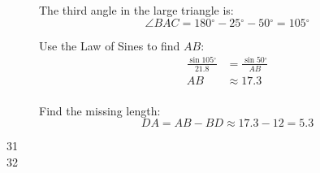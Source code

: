 \documentclass{exam}
\newcommand{\dg}{\ensuremath{^\circ}}
\begin{document}
\begin{description}
        The third angle in the large triangle is: 
        \[
          \angle BAC = 180 \dg - 25 \dg - 50 \dg = 105 \dg
        \]

        Use the Law of Sines to find $AB$:
        \begin{align*}
          \frac{\sin 105 \dg}{21.8} & = \frac{\sin 50 \dg}{AB} \\
          AB                        & \approx 17.3 \\
        \end{align*}

        Find the missing length:
        \[
          DA = AB - BD \approx 17.3 - 12 = \boxed{ 5.3 }
        \]

      \item[31] 

      \pagebreak

      \item[32] 
\end{description}
\end{document}
